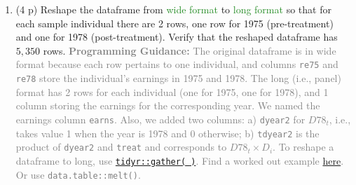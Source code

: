 \documentclass[
]{article}
\providecommand{\tightlist}{%
  \setlength{\itemsep}{0pt}\setlength{\parskip}{0pt}}
\begin{document}
\begin{enumerate}
\def\labelenumi{\alph{enumi}.}
\tightlist
\item
  (4 p) Reshape the dataframe from \textcolor{ForestGreen}{wide format}
  to \textcolor{ForestGreen}{long format} so that for each sample
  individual there are 2 rows, one row for 1975 (pre-treatment) and one
  for 1978 (post-treatment). Verify that the reshaped dataframe has
  \(5,350\) rows.
  \textcolor{gray}{\textbf{Programming Guidance:} The original dataframe is in wide format because each row pertains to one individual, and columns \texttt{re75} and \texttt{re78} store the individual's earnings in 1975 and 1978. The long (i.e., panel) format has 2 rows for each individual (one for 1975, one for 1978), and 1 column storing the earnings for the corresponding year. We named the earnings column \texttt{earns}. Also, we added two columns: a) \texttt{dyear2} for $D78_{t}$, i.e., takes value 1 when the year is 1978 and 0 otherwise; b) \texttt{tdyear2} is the product of \texttt{dyear2} and \texttt{treat} and corresponds to $D78_t \times D_i$. To reshape a dataframe to long, use \href{https://tidyr.tidyverse.org/reference/gather.html}{\texttt{tidyr::gather( )}}. Find a worked out example \href{https://uc-r.github.io/tidyr}{here}. Or use \texttt{data.table::melt()}.}\label{item:BAfter-reshape}
\end{enumerate}
\end{document}
